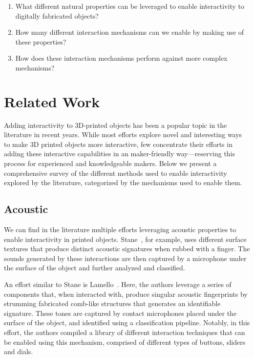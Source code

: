     \begin{enumerate}
      \item What different natural properties can be leveraged to enable
        interactivity to digitally fabricated objects?
      \item How many different interaction mechanisms can we enable by making
        use of these properties?
      \item How does these interaction mechanisms perform against more complex
        mechanisms?
    \end{enumerate}

  \section{Related Work}
    Adding interactivity to 3D-printed objects has been a popular topic in the
    literature in recent years. While most efforts explore novel and
    interesting ways to make 3D printed objects more interactive, few
    concentrate their efforts in adding these interactive capabilities in an
    maker-friendly way---reserving this process for experienced and
    knowledgeable makers. Below we present a comprehensive survey of the
    different methods used to enable interactivity explored by the literature,
    categorized by the mechanisms used to enable them.

    \subsection{Acoustic}
      We can find in the literature multiple efforts leveraging acoustic
      properties to enable interactivity in printed objects.
      Stane~\cite{MurraySmith:2008ch}, for example, uses different surface
      textures that produce distinct acoustic signatures when rubbed with a
      finger. The sounds generated by these interactions are then captured by a
      microphone under the surface of the object and further analyzed and
      classified.

      An effort similar to Stane is Lamello~\cite{Savage:2015cs}.  Here, the
      authors leverage a series of components that, when interacted with,
      produce singular acoustic fingerprints by strumming fabricated comb-like
      structures that generates an identifiable signature. These tones are
      captured by contact microphones placed under the surface of the object,
      and identified using a classification pipeline. Notably, in this effort,
      the authors compiled a library of different interaction techniques that
      can be enabled using this mechanism, comprised of different types of
      buttons, sliders and dials.


